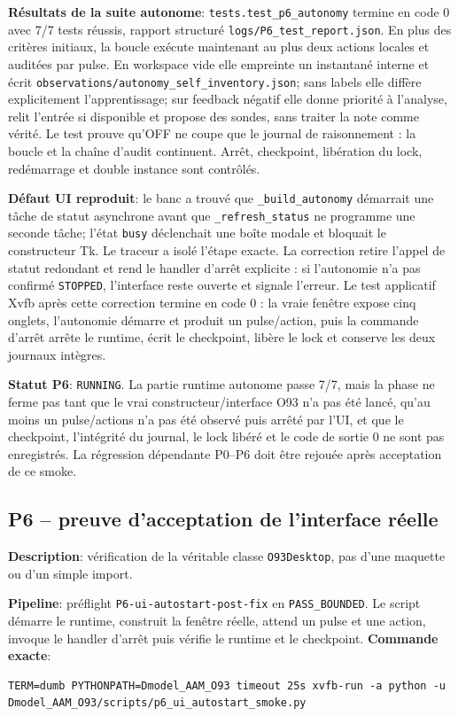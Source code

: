 \documentclass[11pt,a4paper,oneside]{report}
\begin{document}
\textbf{Résultats de la suite autonome}: \texttt{tests.test\_p6\_autonomy} termine en code 0 avec 7/7 tests réussis, rapport structuré \texttt{logs/P6\_test\_report.json}. En plus des critères initiaux, la boucle exécute maintenant au plus deux actions locales et auditées par pulse. En workspace vide elle empreinte un instantané interne et écrit \texttt{observations/autonomy\_self\_inventory.json}; sans labels elle diffère explicitement l'apprentissage; sur feedback négatif elle donne priorité à l'analyse, relit l'entrée si disponible et propose des sondes, sans traiter la note comme vérité. Le test prouve qu'OFF ne coupe que le journal de raisonnement : la boucle et la chaîne d'audit continuent. Arrêt, checkpoint, libération du lock, redémarrage et double instance sont contrôlés.

\textbf{Défaut UI reproduit}: le banc a trouvé que \texttt{\_build\_autonomy} démarrait une tâche de statut asynchrone avant que \texttt{\_refresh\_status} ne programme une seconde tâche; l'état \texttt{busy} déclenchait une boîte modale et bloquait le constructeur Tk. Le traceur a isolé l'étape exacte. La correction retire l'appel de statut redondant et rend le handler d'arrêt explicite : si l'autonomie n'a pas confirmé \texttt{STOPPED}, l'interface reste ouverte et signale l'erreur. Le test applicatif Xvfb après cette correction termine en code 0 : la vraie fenêtre expose cinq onglets, l’autonomie démarre et produit un pulse/action, puis la commande d’arrêt arrête le runtime, écrit le checkpoint, libère le lock et conserve les deux journaux intègres.

\textbf{Statut P6}: \texttt{RUNNING}. La partie runtime autonome passe 7/7, mais la phase ne ferme pas tant que le vrai constructeur/interface O93 n'a pas été lancé, qu'au moins un pulse/actions n'a pas été observé puis arrêté par l'UI, et que le checkpoint, l'intégrité du journal, le lock libéré et le code de sortie 0 ne sont pas enregistrés. La régression dépendante P0--P6 doit être rejouée après acceptation de ce smoke.


\subsection{P6 -- preuve d'acceptation de l'interface réelle}
\textbf{Description}: vérification de la véritable classe \texttt{O93Desktop}, pas d'une maquette ou d'un simple import.

\textbf{Pipeline}: préflight \texttt{P6-ui-autostart-post-fix} en \texttt{PASS\_BOUNDED}. Le script démarre le runtime, construit la fenêtre réelle, attend un pulse et une action, invoque le handler d’arrêt puis vérifie le runtime et le checkpoint.
\textbf{Commande exacte}:
\begin{lstlisting}[basicstyle=\ttfamily\small,breaklines=true]
TERM=dumb PYTHONPATH=Dmodel_AAM_O93 timeout 25s xvfb-run -a python -u Dmodel_AAM_O93/scripts/p6_ui_autostart_smoke.py
\end{lstlisting}
\end{document}
